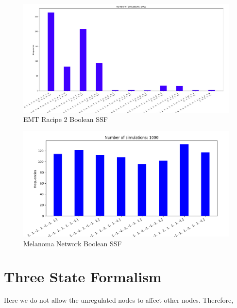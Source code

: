 \documentclass{article}
\begin{document}
\begin{itemize}
		\begin{figure}[H]\centering
			\includegraphics[scale=0.4]{img/emtracipe2boolssf.png}
			\caption{EMT Racipe 2 Boolean SSF}
		\end{figure}


\begin{figure}[H]
\centering 


\includegraphics[scale=0.4]{img/melanomabooleanssf.png}
\caption{Melanoma Network Boolean SSF}
\end{figure}




\end{itemize}

\section{Three State Formalism}

Here we do not allow the unregulated nodes to affect other nodes. Therefore, 
\end{document}

